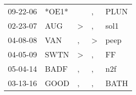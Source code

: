 \begin{supertabular}{lllll}
 09-22-06 &  *OE1* &               &             , &  PLUN \\
 02-23-07 &    AUG &  \textgreater &             , &  sol1 \\
 04-08-08 &    VAN &             , &  \textgreater &  peep \\
 04-05-09 &   SWTN &  \textgreater &             , &    FF \\
 05-04-14 &   BADF &             , &             , &   n2f \\
 03-13-16 &   GOOD &             , &             , &  BATH \\
\end{supertabular}

